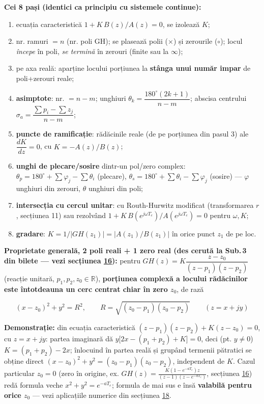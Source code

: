\documentclass[10pt,a4paper]{article}
\begin{document}
\textbf{Cei 8 pași (identici ca principiu cu sistemele continue):}
\begin{enumerate}
\item ecuația caracteristică $1+K\,B(z)/A(z)=0$, se izolează $K$;
\item nr. ramuri $=n$ (nr. poli GH); se plasează polii ($\times$) și zerourile ($\circ$); locul \emph{începe} în poli, \emph{se termină} în zerouri (finite sau la $\infty$);
\item pe axa reală: aparține locului porțiunea la \textbf{stânga unui număr impar} de poli+zerouri reale;
\item \textbf{asimptote}: nr. $=n-m$; unghiuri $\theta_k=\dfrac{180^\circ(2k+1)}{n-m}$; abscisa centrului $\sigma_a=\dfrac{\sum p_i-\sum z_j}{n-m}$;
\item \textbf{puncte de ramificație}: rădăcinile reale (de pe porțiunea din pasul 3) ale $\dfrac{dK}{dz}=0$, cu $K=-A(z)/B(z)$;
\item \textbf{unghi de plecare/sosire} dintr-un pol/zero complex: $\theta_p=180^\circ+\sum\varphi_j-\sum\theta_i$ (plecare), $\theta_s=180^\circ+\sum\theta_i-\sum\varphi_j$ (sosire) — $\varphi$ unghiuri din zerouri, $\theta$ unghiuri din poli;
\item \textbf{intersecția cu cercul unitar}: cu Routh-Hurwitz modificat (transformarea $r$, secțiunea 11) sau rezolvând $1+K\,B(e^{j\omega T_e})/A(e^{j\omega T_e})=0$ pentru $\omega,K$;
\item \textbf{gradare}: $K=1/|GH(z_1)|=|A(z_1)/B(z_1)|$ în orice punct $z_1$ de pe loc.
\end{enumerate}

\textbf{Proprietate generală, 2 poli reali + 1 zero real (des cerută la Sub.\,3 din bilete — vezi secțiunea \hyperref[sec:16]{16}):} pentru $GH(z)=K\dfrac{z-z_0}{(z-p_1)(z-p_2)}$ (reacție unitară, $p_1,p_2,z_0\in\mathbb R$), \textbf{porțiunea complexă a locului rădăcinilor este întotdeauna un cerc centrat chiar în zero $z_0$}, de rază
\begin{keyeq}\color{red!65!black}
$$(x-z_0)^2+y^2=R^2,\qquad R=\sqrt{(z_0-p_1)(z_0-p_2)}\qquad(z=x+jy)$$
\end{keyeq}
\textbf{Demonstrație:} din ecuația caracteristică $ (z-p_1)(z-p_2)+K(z-z_0)=0$, cu $z=x+jy$: partea imaginară dă $y\big[2x-(p_1{+}p_2)+K\big]=0$, deci (pt. $y\ne0$) $K=(p_1{+}p_2)-2x$; înlocuind în partea reală și grupând termenii pătratici se obține direct $(x-z_0)^2+y^2=(z_0-p_1)(z_0-p_2)$, independent de $K$. Cazul particular $z_0{=}0$ (zero în origine, ex. $GH(z)=\frac{K(1{-}e^{-aT_e})z}{(z-1)(z-e^{-aT_e})}$, secțiunea \hyperref[sec:16]{16}) redă formula veche $x^2{+}y^2{=}e^{-aT_e}$; formula de mai sus e însă \textbf{valabilă pentru orice $z_0$} — vezi aplicațiile numerice din secțiunea \hyperref[sec:18]{18}.
\end{document}
